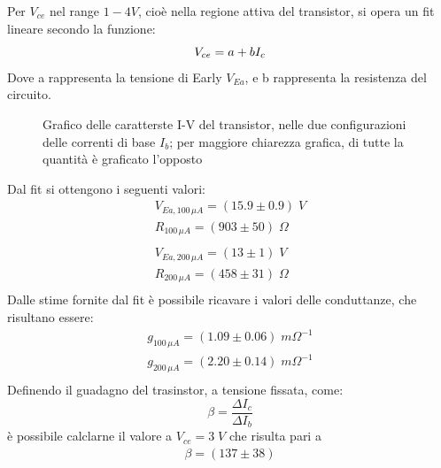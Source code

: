\documentclass{article}
\begin{document}
Per $V_{ce}$ nel range $1-4 V$, cioè nella regione attiva del transistor, si opera un fit lineare secondo la funzione:
\begin{equation}
    V_{ce} = a + b I_c\\
\end{equation}
Dove a rappresenta la tensione di Early $V_{Ea}$, e b rappresenta la resistenza del circuito.\\
\begin{figure}[H]
    \begin{center}
        \scalebox{0.7}{}
        \caption{\centering\label{fig:multigraph}Grafico delle caratterste I-V del transistor, nelle due configurazioni delle correnti di base $I_b$; per maggiore chiarezza grafica, di tutte la quantità è graficato l'opposto}
    \end{center}
\end{figure}
Dal fit si ottengono i seguenti valori:
\begin{equation}
    \begin{aligned}
        V_{Ea,100\,\mu A}=(15.9\pm 0.9) \;V  \\
        R_{100\,\mu A}=(903 \pm 50) \;\Omega \\
        \\
        V_{Ea,200\,\mu A}=(13\pm 1) \;V      \\
        R_{200\,\mu A}=(458 \pm 31) \;\Omega \\
    \end{aligned}
\end{equation}
Dalle stime fornite dal fit è possibile ricavare i valori delle conduttanze, che risultano essere:
\begin{equation}
    \begin{aligned}
        g_{100 \,\mu A}=(1.09 \pm 0.06) \;m\Omega^{-1} \\
        g_{200 \,\mu A}=(2.20 \pm 0.14) \;m\Omega^{-1} \\
    \end{aligned}
\end{equation}
Definendo il guadagno del trasinstor, a tensione fissata, come:
\begin{equation}
    \beta= \frac{\Delta I_c}{\Delta I_b}
\end{equation}
è possibile calclarne il valore a $V_{ce}=3 \;V$ che risulta pari a
\begin{equation}
    \begin{aligned}
        \beta=(137\pm38)
    \end{aligned}
\end{equation}
\end{document}
